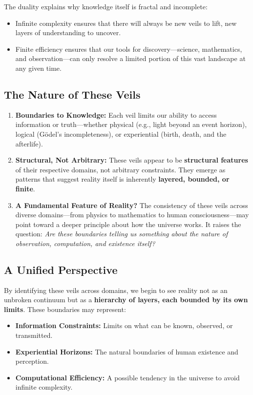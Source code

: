 \documentclass[12pt]{article}
\begin{document}
The duality explains why knowledge itself is fractal and incomplete:
\begin{itemize}
    \item Infinite complexity ensures that there will always be new veils to lift, new layers of understanding to uncover.
    \item Finite efficiency ensures that our tools for discovery—science, mathematics, and observation—can only resolve a limited portion of this vast landscape at any given time.
\end{itemize}


\subsection{The Nature of These Veils}

\begin{enumerate}
    \item \textbf{Boundaries to Knowledge:} Each veil limits our ability to access information or truth—whether physical (e.g., light beyond an event horizon), logical (Gödel’s incompleteness), or experiential (birth, death, and the afterlife).
    \item \textbf{Structural, Not Arbitrary:} These veils appear to be \textbf{structural features} of their respective domains, not arbitrary constraints. They emerge as patterns that suggest reality itself is inherently \textbf{layered, bounded, or finite}.
    \item \textbf{A Fundamental Feature of Reality?} The consistency of these veils across diverse domains—from physics to mathematics to human consciousness—may point toward a deeper principle about how the universe works. It raises the question: \emph{Are these boundaries telling us something about the nature of observation, computation, and existence itself?}
\end{enumerate}

\subsection{A Unified Perspective}

By identifying these veils across domains, we begin to see reality not as an unbroken continuum but as a \textbf{hierarchy of layers, each bounded by its own limits}. These boundaries may represent:
\begin{itemize}
    \item \textbf{Information Constraints:} Limits on what can be known, observed, or transmitted.
    \item \textbf{Experiential Horizons:} The natural boundaries of human existence and perception.
    \item \textbf{Computational Efficiency:} A possible tendency in the universe to avoid infinite complexity.
\end{itemize}
\end{document}
